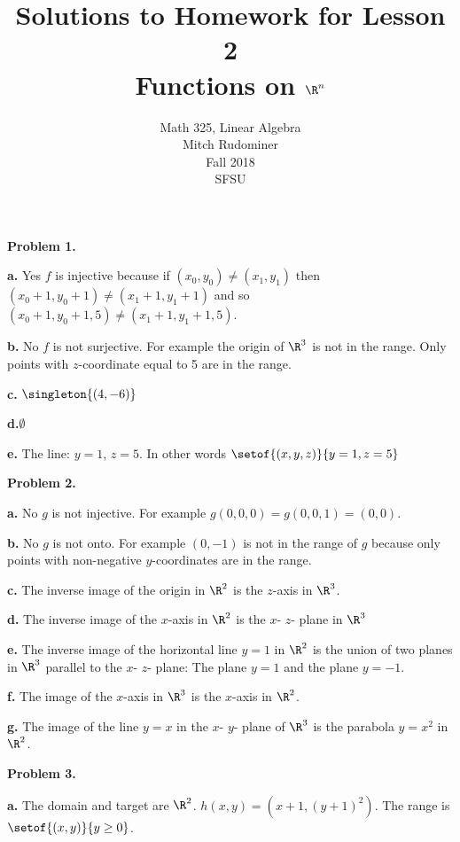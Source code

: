 \documentclass[oneside,12pt]{amsart}
\begin{document}
\title{Solutions to Homework for Lesson 2 \\ Functions on $\R^n$}
\author{Math 325, Linear Algebra \\ Mitch Rudominer \\ Fall 2018 \\ SFSU }
\date{}

\maketitle


\textbf{Problem 1.}

\textbf{a.} Yes $f$ is injective because if $(x_0, y_0) \not= (x_1, y_1)$
then $(x_0 +1 , y_0 +1) \not= (x_1 +1 , y_1 +1)$ and so
 $(x_0 +1 , y_0 +1, 5) \not= (x_1 +1 , y_1 +1, 5)$.


\textbf{b.} No $f$ is not surjective. For example the origin of $\R^3$ is not in
the range. Only points with $z$-coordinate equal to 5 are in the range.


\textbf{c.} $\singleton{(4, -6)}$


\textbf{d.}$\emptyset$


\textbf{e.} The line: $y=1$, $z=5$. In other words $\setof{(x,y,z)}{y=1, z=5}$

\medskip

\textbf{Problem 2.}

\textbf{a.} No $g$ is not injective. For example
$g(0,0,0) = g(0, 0,1) = (0,0)$.


\textbf{b.} No $g$ is not onto. For example $(0, -1)$ is not in the range of
$g$ because only points with non-negative $y$-coordinates are in the range.


\textbf{c.} The inverse image of the origin in $\R^2$ is the $z$-axis in $\R^3$.


\textbf{d.} The inverse image of the $x$-axis in $\R^2$ is the $x$- $z$- plane
in $\R^3$

\textbf{e.} The inverse image of the horizontal line $y=1$ in $\R^2$ is
the union of two planes in $\R^3$ parallel to the $x$- $z$- plane: The
plane $y=1$ and the plane $y=-1$.

\textbf{f.} The image of the $x$-axis in $\R^3$ is the $x$-axis in $\R^2$.

\textbf{g.} The  image of the line $y=x$ in the $x$- $y$- plane
of $\R^3$ is the parabola $y=x^2$ in $\R^2$.


\medskip

\textbf{Problem 3.}

\textbf{a.}  The domain and target are $\R^2$.
$h(x,y) = (x+1, (y+1)^2)$.
The range is $\setof{(x,y)}{y\geq 0}$.
\end{document}
